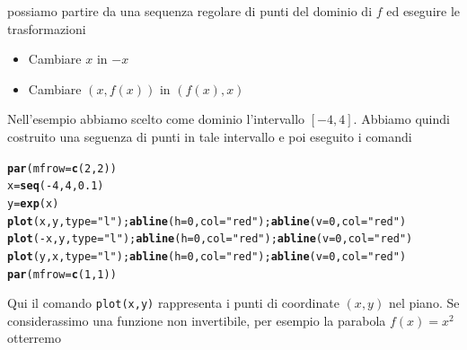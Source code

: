 \documentclass[onecolumn,11pt]{book}\usepackage[]{graphicx}\usepackage[]{color}
\makeatletter
\newcommand{\hlnum}[1]{\textcolor[rgb]{0.686,0.059,0.569}{#1}}%
\newcommand{\hlstr}[1]{\textcolor[rgb]{0.192,0.494,0.8}{#1}}%
\newcommand{\hlopt}[1]{\textcolor[rgb]{0,0,0}{#1}}%
\newcommand{\hlstd}[1]{\textcolor[rgb]{0.345,0.345,0.345}{#1}}%
\newcommand{\hlkwb}[1]{\textcolor[rgb]{0.69,0.353,0.396}{#1}}%
\newcommand{\hlkwc}[1]{\textcolor[rgb]{0.333,0.667,0.333}{#1}}%
\newcommand{\hlkwd}[1]{\textcolor[rgb]{0.737,0.353,0.396}{\textbf{#1}}}%
\newenvironment{kframe}{%
 \def\at@end@of@kframe{}%
 \ifinner\ifhmode%
  \def\at@end@of@kframe{\end{minipage}}%
  \begin{minipage}{\columnwidth}%
 \fi\fi%
 \def\FrameCommand##1{\hskip\@totalleftmargin \hskip-\fboxsep
 \colorbox{shadecolor}{##1}\hskip-\fboxsep
     \hskip-\linewidth \hskip-\@totalleftmargin \hskip\columnwidth}%
 \MakeFramed {\advance\hsize-\width
   \@totalleftmargin\z@ \linewidth\hsize
   \@setminipage}}%
 {\par\unskip\endMakeFramed%
 \at@end@of@kframe}
\newenvironment{knitrout}{}{} %
\makeatother
\begin{document}
possiamo partire da una sequenza regolare di punti del dominio  di $f$ ed eseguire le trasformazioni
\begin{itemize}
\item Cambiare $x$ in $-x$
\item Cambiare $(x,f(x))$ in $(f(x),x)$
\end{itemize}
Nell'esempio abbiamo scelto come dominio l'intervallo $[-4,4]$. Abbiamo quindi costruito una seguenza di punti in tale intervallo e poi eseguito i comandi
\begin{knitrout}
\color{fgcolor}\begin{kframe}
\begin{alltt}
\hlkwd{par}\hlstd{(}\hlkwc{mfrow}\hlstd{=}\hlkwd{c}\hlstd{(}\hlnum{2}\hlstd{,}\hlnum{2}\hlstd{))}
\hlstd{x}\hlkwb{=}\hlkwd{seq}\hlstd{(}\hlopt{-}\hlnum{4}\hlstd{,}\hlnum{4}\hlstd{,}\hlnum{0.1}\hlstd{)}
\hlstd{y}\hlkwb{=}\hlkwd{exp}\hlstd{(x)}
\hlkwd{plot}\hlstd{(x,y,}\hlkwc{type}\hlstd{=}\hlstr{"l"}\hlstd{);}\hlkwd{abline}\hlstd{(}\hlkwc{h}\hlstd{=}\hlnum{0}\hlstd{,}\hlkwc{col}\hlstd{=}\hlstr{"red"}\hlstd{);}\hlkwd{abline}\hlstd{(}\hlkwc{v}\hlstd{=}\hlnum{0}\hlstd{,}\hlkwc{col}\hlstd{=}\hlstr{"red"}\hlstd{)}
\hlkwd{plot}\hlstd{(}\hlopt{-}\hlstd{x,y,}\hlkwc{type}\hlstd{=}\hlstr{"l"}\hlstd{);}\hlkwd{abline}\hlstd{(}\hlkwc{h}\hlstd{=}\hlnum{0}\hlstd{,}\hlkwc{col}\hlstd{=}\hlstr{"red"}\hlstd{);}\hlkwd{abline}\hlstd{(}\hlkwc{v}\hlstd{=}\hlnum{0}\hlstd{,}\hlkwc{col}\hlstd{=}\hlstr{"red"}\hlstd{)}
\hlkwd{plot}\hlstd{(y,x,}\hlkwc{type}\hlstd{=}\hlstr{"l"}\hlstd{);}\hlkwd{abline}\hlstd{(}\hlkwc{h}\hlstd{=}\hlnum{0}\hlstd{,}\hlkwc{col}\hlstd{=}\hlstr{"red"}\hlstd{);}\hlkwd{abline}\hlstd{(}\hlkwc{v}\hlstd{=}\hlnum{0}\hlstd{,}\hlkwc{col}\hlstd{=}\hlstr{"red"}\hlstd{)}
\hlkwd{par}\hlstd{(}\hlkwc{mfrow}\hlstd{=}\hlkwd{c}\hlstd{(}\hlnum{1}\hlstd{,}\hlnum{1}\hlstd{))}
\end{alltt}
\end{kframe}
\end{knitrout}
Qui il comando \texttt{plot(x,y)} rappresenta i punti di coordinate $(x,y)$ nel piano.
Se considerassimo una funzione non invertibile, per esempio la parabola
$f(x)=x^2$
otterremo
\end{document}
